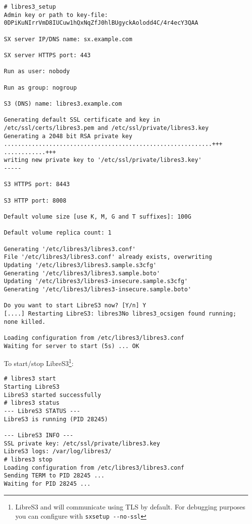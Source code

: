 \begin{lstlisting}
# libres3_setup
Admin key or path to key-file: 0DPiKuNIrrVmD8IUCuw1hQxNqZfJ0hlBUgyckAolodd4C/4r4ecY3QAA

SX server IP/DNS name: sx.example.com

SX server HTTPS port: 443

Run as user: nobody

Run as group: nogroup

S3 (DNS) name: libres3.example.com

Generating default SSL certificate and key in /etc/ssl/certs/libres3.pem and /etc/ssl/private/libres3.key
Generating a 2048 bit RSA private key
............................................................+++
............+++
writing new private key to '/etc/ssl/private/libres3.key'
-----

S3 HTTPS port: 8443

S3 HTTP port: 8008

Default volume size [use K, M, G and T suffixes]: 100G

Default volume replica count: 1

Generating '/etc/libres3/libres3.conf'
File '/etc/libres3/libres3.conf' already exists, overwriting
Updating '/etc/libres3/libres3.sample.s3cfg'
Generating '/etc/libres3/libres3.sample.boto'
Updating '/etc/libres3/libres3-insecure.sample.s3cfg'
Generating '/etc/libres3/libres3-insecure.sample.boto'

Do you want to start LibreS3 now? [Y/n] Y
[....] Restarting LibreS3: libres3No libres3_ocsigen found running; none killed.

Loading configuration from /etc/libres3/libres3.conf
Waiting for server to start (5s) ... OK
\end{lstlisting}


To start/stop LibreS3\footnote{LibreS3 and \SX will communicate using TLS by
default. For debugging purposes you can configure \SX with \texttt{sxsetup -{}-no-ssl}}:

\begin{lstlisting}
# libres3 start
Starting LibreS3
LibreS3 started successfully
# libres3 status
--- LibreS3 STATUS ---
LibreS3 is running (PID 28245)

--- LibreS3 INFO ---
SSL private key: /etc/ssl/private/libres3.key
LibreS3 logs: /var/log/libres3/
# libres3 stop
Loading configuration from /etc/libres3/libres3.conf
Sending TERM to PID 28245 ... 
Waiting for PID 28245 ...
\end{lstlisting}


